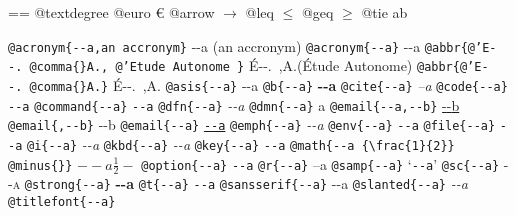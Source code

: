 \documentclass{book}
\makeatletter
\newcommand\GNUTexinfocommandstyletextcite[1]{{\normalfont{}\textsl{#1}}}%
\newcommand\GNUTexinfocommandstyletextkbd[1]{{\ttfamily\textsl{#1}}}%
\newenvironment{GNUTexinfopreformatted}{%
  \par\obeylines\obeyspaces\frenchspacing
  \parskip=\z@\parindent=\z@}{}
\makeatother
\begin{document}
\begin{GNUTexinfopreformatted}
@textdegree \textdegree{}
@euro \euro{}
@arrow $\rightarrow{}$
@leq $\leq{}$
@geq $\geq{}$
@tie a\hbox{}b

\texttt{@acronym\{{-}{-}a,an accronym\}} {-}{-}a (an accronym)
\texttt{@acronym\{{-}{-}a\}} {-}{-}a
\texttt{@abbr\{@'E{-}{-}.\ @comma\{\}A.,\ @'Etude Autonome \}} \'{E}{-}{-}.\@\ ,A.\@ (\'{E}tude Autonome)
\texttt{@abbr\{@'E{-}{-}.\ @comma\{\}A.\}} \'{E}{-}{-}.\@\ ,A.\@
\texttt{@asis\{{-}{-}a\}} {-}{-}a
\texttt{@b\{{-}{-}a\}} \textbf{{-}{-}a}
\texttt{@cite\{{-}{-}a\}} \GNUTexinfocommandstyletextcite{--a}
\texttt{@code\{{-}{-}a\}} \texttt{{-}{-}a}
\texttt{@command\{{-}{-}a\}} \texttt{{-}{-}a}
\texttt{@dfn\{{-}{-}a\}} \textsl{{-}{-}a}
\texttt{@dmn\{{-}{-}a\}} \thinspace {-}{-}a
\texttt{@email\{{-}{-}a,{-}{-}b\}} \href{mailto:--a}{{-}{-}b}
\texttt{@email\{,{-}{-}b\}} {-}{-}b
\texttt{@email\{{-}{-}a\}} \href{mailto:--a}{\nolinkurl{--a}}
\texttt{@emph\{{-}{-}a\}} \emph{{-}{-}a}
\texttt{@env\{{-}{-}a\}} \texttt{{-}{-}a}
\texttt{@file\{{-}{-}a\}} \texttt{{-}{-}a}
\texttt{@i\{{-}{-}a\}} \textit{{-}{-}a}
\texttt{@kbd\{{-}{-}a\}} \GNUTexinfocommandstyletextkbd{{-}{-}a}
\texttt{@key\{{-}{-}a\}} \texttt{{-}{-}a}
\texttt{@math\{{-}{-}a \{\textbackslash{}frac\{1\}\{2\}\} @minus\{\}\}} $--a {\frac{1}{2}} -$
\texttt{@option\{{-}{-}a\}} \texttt{{-}{-}a}
\texttt{@r\{{-}{-}a\}} \textnormal{--a}
\texttt{@samp\{{-}{-}a\}} `\texttt{{-}{-}a}'
\texttt{@sc\{{-}{-}a\}} \textsc{{-}{-}a}
\texttt{@strong\{{-}{-}a\}} \textbf{{-}{-}a}
\texttt{@t\{{-}{-}a\}} \texttt{{-}{-}a}
\texttt{@sansserif\{{-}{-}a\}} \textsf{{-}{-}a}
\texttt{@slanted\{{-}{-}a\}} \textsl{{-}{-}a}
\texttt{@titlefont\{{-}{-}a\}} \end{GNUTexinfopreformatted}
\end{document}
